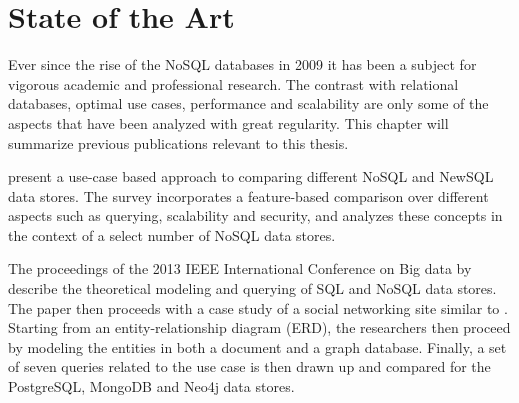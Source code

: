 \chapter{State of the Art}
\label{ch:state-of-the-art}

Ever since the rise of the NoSQL databases in 2009 \autocite{Sadalage2012} it has been a subject for vigorous academic and professional research. The contrast with relational databases, optimal use cases, performance and scalability are only some of the aspects that have been analyzed with great regularity. This chapter will summarize previous publications relevant to this thesis.

\textcite{Grolinger2013} present a use-case based approach to comparing different NoSQL and NewSQL data stores. The survey incorporates a feature-based comparison over different aspects such as querying, scalability and security, and analyzes these concepts in the context of a select number of NoSQL data stores.

The proceedings of the 2013 IEEE International Conference on Big data by \textcite{Kaur2013} describe the theoretical modeling and querying of SQL and NoSQL data stores. The paper then proceeds with a case study of a social networking site similar to \autocite{Malda1997}. Starting from an entity-relationship diagram (ERD), the researchers then proceed by modeling the entities in both a document and a graph database. Finally, a set of seven queries related to the use case is then drawn up and compared for the PostgreSQL, MongoDB and Neo4j data stores.

